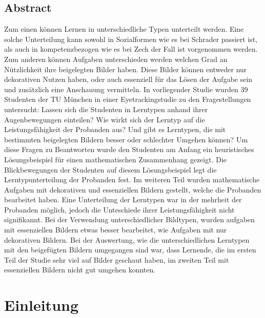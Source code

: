 \section*{Abstract}

Zum einen können Lernen in unterschiedliche Typen unterteilt werden. Eine solche Unterteilung kann sowohl in Sozialformen wie es bei Schrader passiert ist, als auch in kompetenzbezogen wie es bei Zech der Fall ist vorgenommen werden. Zum anderen können Aufgaben unterschieden werden welchen Grad an Nützlichkeit ihre beigelegten Bilder haben. Diese Bilder können entweder nur dekorativen Nutzen haben, oder auch essenziell für das Lösen der Aufgabe sein und zusätzlich eine Anschauung vermitteln. In vorliegender Studie wurden 39 Studenten der TU München in einer Eyetrackingstudie zu den Fragestellungen untersucht: Lassen sich die Studenten in Lerntypen anhand ihrer Augenbewegungen einteilen? Wie wirkt sich der Lerntyp auf die Leistungsfähigkeit der Probanden aus? Und gibt es Lerntypen, die mit bestimmten beigelegten Bildern besser oder schlechter Umgehen können?  
Um diese Fragen zu Beantworten wurde den Studenten am Anfang ein heuristisches Lösungsbeispiel für einen mathematischen Zusammenhang gezeigt. Die Blickbewegungen der Studenten auf diesem Lösungsbeispiel legt die Lerntypunterteilung der Probanden fest. Im weiteren Teil wurden mathematische Aufgaben mit dekorativen und essenziellen Bildern gestellt, welche die Probanden bearbeitet haben. Eine Unterteilung der Lerntypen war in der mehrheit der Probanden möglich, jedoch die Unteschiede ihrer Leistungsfähigkeit nicht signifikannt. Bei der Verwendung unterschiedlicher Bildtypen, wurden aufgaben mit essenziellen Bildern etwas besser bearbeitet, wie Aufgaben mit nur dekorativen Bildern. Bei der Auswertung, wie die unterschiedlichen Lerntypen mit den beigefügten Bildern umgegangen sind war, dass Lernende, die im ersten Teil der Studie sehr viel auf Bilder geschaut haben, im zweiten Teil mit essenziellen Bildern nicht gut umgehen konnten.


\tableofcontents %

\chapter{Einleitung}

